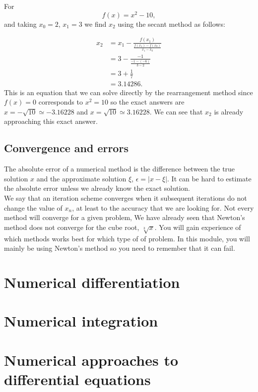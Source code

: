 \begin{ex}
For 
\begin{equation*}
f(x)=x^{2}-10,
\end{equation*}
and taking $x_{0}=2$, $x_{1}=3$ we find $x_{2}$ using the secant method as follows:

\begin{align*}
x_{2}&=x_{1}-\frac{f(x_{1})}{\frac{f(x_{1})-f(x_{0})}{x_{1}-x_{0}}}\\
	&=3-\frac{-1}{\frac{-1-(-6)}{3-2}}\\
	&=3+\frac{1}{7}\\
	&=3.14286.
\end{align*}
This is an equation that we can solve directly by the rearrangement method since $f(x)=0$ corresponds to $x^{2}=10$ so the exact answers are $x=-\sqrt{10}\simeq -3.16228$ and $x=\sqrt{10}\simeq 3.16228$. We can see that $x_{2}$ is already approaching this exact answer.

\end{ex}

\subsection*{Convergence and errors}
The absolute error of a numerical method is the difference between the true solution $x$ and the approximate solution $\xi$, $\epsilon =\vert x-\xi\vert$. It can be hard to estimate the absolute error unless we already know the exact solution. \\

We say that an iteration scheme converges when it subsequent iterations do not change the value of $x_{n}$, at least to the accuracy that we are looking for. Not every method will converge for a given problem, We have already seen that Newton's method does not converge for the cube root, $\sqrt[3]{x}$. You will gain experience of which methods works best for which type of of problem. In this module, you will mainly be using Newton's method so you need to remember that it can fail.

\section{Numerical differentiation}

\section{Numerical integration}

\section{Numerical approaches to differential equations}